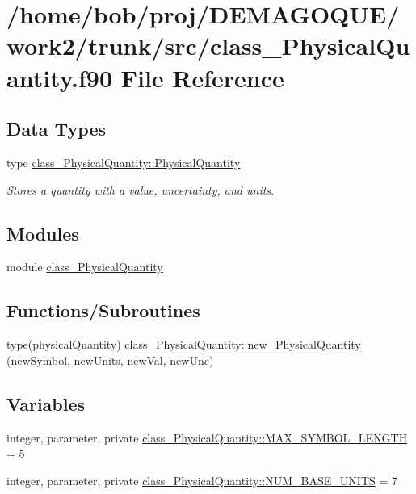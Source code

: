 \hypertarget{class__PhysicalQuantity_8f90}{
\section{/home/bob/proj/DEMAGOQUE/work2/trunk/src/class\_\-PhysicalQuantity.f90 File Reference}
\label{class__PhysicalQuantity_8f90}
}
\subsection*{Data Types}
\begin{DoxyCompactItemize}
\item 
type \hyperlink{typeclass__PhysicalQuantity_1_1PhysicalQuantity}{class\_\-PhysicalQuantity::PhysicalQuantity}
\begin{DoxyCompactList}\small\item\em Stores a quantity with a value, uncertainty, and units. \item\end{DoxyCompactList}\end{DoxyCompactItemize}
\subsection*{Modules}
\begin{DoxyCompactItemize}
\item 
module \hyperlink{namespaceclass__PhysicalQuantity}{class\_\-PhysicalQuantity}
\end{DoxyCompactItemize}
\subsection*{Functions/Subroutines}
\begin{DoxyCompactItemize}
\item 
type(physicalQuantity) \hyperlink{namespaceclass__PhysicalQuantity_ac1a3d1ca8ee8896007badfdcd7e3333b}{class\_\-PhysicalQuantity::new\_\-PhysicalQuantity} (newSymbol, newUnits, newVal, newUnc)
\end{DoxyCompactItemize}
\subsection*{Variables}
\begin{DoxyCompactItemize}
\item 
integer, parameter, private \hyperlink{namespaceclass__PhysicalQuantity_a9a49f0ad012c6d03a17e68cc71867a2d}{class\_\-PhysicalQuantity::MAX\_\-SYMBOL\_\-LENGTH} = 5
\item 
integer, parameter, private \hyperlink{namespaceclass__PhysicalQuantity_a2e10d9a38cddedc3b7705d597476550f}{class\_\-PhysicalQuantity::NUM\_\-BASE\_\-UNITS} = 7
\end{DoxyCompactItemize}
